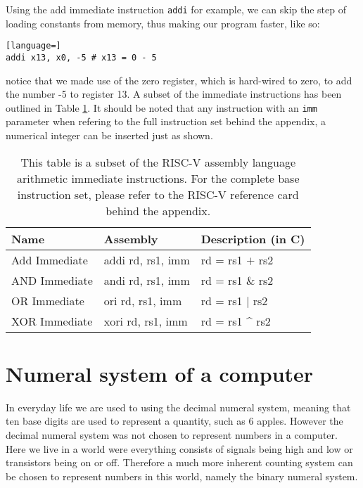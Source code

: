     Using the add immediate instruction \texttt{addi} for example, we can skip the step of loading constants from memory, thus making our program faster, like so:
    \begin{lstlisting}[language=]
addi x13, x0, -5 # x13 = 0 - 5
    \end{lstlisting}
    notice that we made use of the zero register, which is hard-wired to zero, to add the number -5 to register 13. A subset of the immediate instructions has been outlined in Table \ref{table:RISCVImmediateInstructions}. It should be noted that any instruction with an \texttt{imm} parameter when refering to the full instruction set behind the appendix, a numerical integer can be inserted just as shown.
    
    \begin{table}[h!]
        \centering
        \begin{tabular}{|l|l|l|}
        	\hline
        	Name          & Assembly          & Description (in C) \\ \hline
        	Add Immediate & addi rd, rs1, imm & rd = rs1 $+$ rs2   \\
        	AND Immediate & andi rd, rs1, imm & rd = rs1 \& rs2    \\
        	OR Immediate  & ori rd, rs1, imm  & rd = rs1 $|$ rs2   \\
        	XOR Immediate & xori rd, rs1, imm & rd = rs1 \^{} rs2  \\ \hline
        \end{tabular}
        \caption{This table is a subset of the RISC-V assembly language arithmetic immediate instructions. For the complete base instruction set, please refer to the RISC-V reference card behind the appendix.}
        \label{table:RISCVImmediateInstructions}
    \end{table}
        
\section{Numeral system of a computer}
    In everyday life we are used to using the decimal numeral system, meaning that ten base digits are used to represent a quantity, such as 6 apples. However the decimal numeral system was not chosen to represent numbers in a computer. Here we live in a world were everything consists of signals being high and low or transistors being on or off. Therefore a much more inherent counting system can be chosen to represent numbers in this world, namely the binary numeral system.
    
